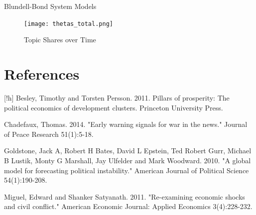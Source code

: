 \begin{appendix}
    \begin{table}[!h]
        \caption{Blundell-Bond System Models}
        \begin{minipage}{.5\linewidth}
          
        \end{minipage}%
        \begin{minipage}{.5\linewidth}
            
        \end{minipage}
        \label{gmm_mods}
    \end{table}

    \clearpage
    \newpage

    \begin{figure}[!h]
        \centering
        \texttt{[image: thetas\_total.png]}
        \caption{Topic Shares over Time}
        \label{tstopics}
    \end{figure}

\end{appendix}

\clearpage

\newpage

\section*{References}[!h]
Besley, Timothy and Torsten Persson. 2011. Pillars of prosperity: The political economics \newline \indent of development clusters. Princeton University Press.\vspace{0.25cm}

\noindent Chadefaux, Thomas. 2014. "Early warning signals for war in the news." Journal of Peace \newline \indent Research 51(1):5-18.\vspace{0.25cm}

\noindent Goldstone, Jack A, Robert H Bates, David L Epstein, Ted Robert Gurr, Michael B Lustik, \newline \indent Monty G Marshall, Jay Ulfelder and Mark Woodward. 2010. "A global model for \newline \indent forecasting political instability." American Journal of Political Science 54(1):190-208.\vspace{0.25cm}

\noindent Miguel, Edward and Shanker Satyanath. 2011. "Re-examining economic shocks and civil \newline \indent conflict." American Economic Journal: Applied Economics 3(4):228-232.\vspace{0.25cm}

